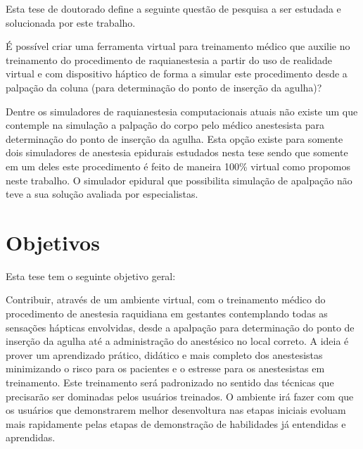 Esta tese de doutorado define a seguinte questão de pesquisa a ser estudada e solucionada por este trabalho.

\begin{prob}
\label{prob:simuladorCasoReal}
    É possível criar uma ferramenta virtual para treinamento médico que auxilie no treinamento do procedimento de raquianestesia a partir do uso de realidade virtual e com dispositivo háptico de forma a simular este procedimento desde a palpação da coluna (para determinação do ponto de inserção da agulha)?
\end{prob}

Dentre os simuladores de raquianestesia computacionais atuais não existe um que contemple na simulação a palpação do corpo pelo médico anestesista para determinação do ponto de inserção da agulha. Esta opção existe para somente dois simuladores de anestesia epidurais estudados nesta tese sendo que somente em um deles este procedimento é feito de maneira 100\% virtual como propomos neste trabalho. O simulador epidural que possibilita simulação de apalpação não teve a sua solução avaliada por especialistas. 

\section{Objetivos}
\label{sec:objetivos}

Esta tese tem o seguinte objetivo geral:

Contribuir, através de um ambiente virtual, com o treinamento médico do procedimento de anestesia raquidiana em gestantes contemplando todas as sensações hápticas envolvidas, desde a apalpação para determinação do ponto de inserção da agulha até a administração do anestésico no local correto. A ideia é prover um aprendizado prático, didático e mais completo dos anestesistas minimizando o risco para os pacientes e o estresse para os anestesistas em treinamento. Este treinamento será padronizado no sentido das técnicas que precisarão ser dominadas pelos usuários treinados. O ambiente irá fazer com que os usuários que demonstrarem melhor desenvoltura nas etapas iniciais evoluam mais rapidamente pelas etapas de demonstração de habilidades já entendidas e aprendidas. 

